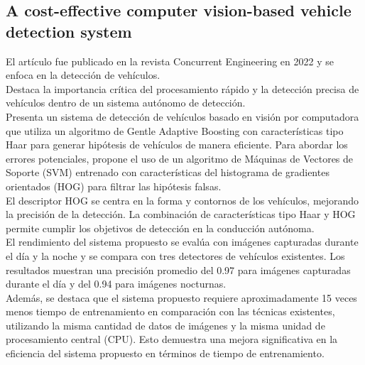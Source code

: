 \subsection{
    \textbf{A cost-effective computer vision-based vehicle detection system}
    ~\cite{alam2022cost}
}\label{subsec:cost-effective-vehicle-detection}
El artículo fue publicado en la revista Concurrent Engineering en 2022 y se enfoca en la detección de vehículos.
\\Destaca la importancia crítica del procesamiento rápido y la detección precisa de vehículos dentro de un sistema autónomo de detección.
\\Presenta un sistema de detección de vehículos basado en visión por computadora que utiliza un algoritmo de Gentle Adaptive Boosting
con características tipo Haar para generar hipótesis de vehículos de manera eficiente.
Para abordar los errores potenciales, propone el uso de un algoritmo de Máquinas de Vectores de Soporte (SVM) entrenado con características
del histograma de gradientes orientados (HOG) para filtrar las hipótesis falsas.
\\El descriptor HOG se centra en la forma y contornos de los vehículos, mejorando la precisión de la detección.
La combinación de características tipo Haar y HOG permite cumplir los objetivos de detección en la conducción autónoma.
\\El rendimiento del sistema propuesto se evalúa con imágenes capturadas durante el día y la noche y se compara con tres detectores
de vehículos existentes. Los resultados muestran una precisión promedio del 0.97 para imágenes capturadas durante el día
y del 0.94 para imágenes nocturnas.                                                                                               \\Además, se destaca que el sistema propuesto requiere aproximadamente 15 veces menos tiempo
de entrenamiento en comparación con las técnicas existentes, utilizando la misma cantidad de datos de imágenes y la misma unidad
de procesamiento central (CPU). Esto demuestra una mejora significativa en la eficiencia del sistema propuesto en términos de tiempo de entrenamiento.
